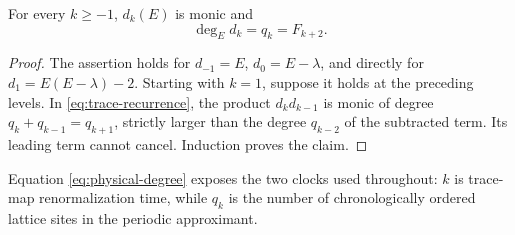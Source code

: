 \begin{proposition}
For every \(k\ge-1\), \(d_k(E)\) is monic and
\begin{equation}
\deg_Ed_k=q_k=F_{k+2}.
\label{eq:physical-degree}
\end{equation}
\end{proposition}

\begin{proof}
The assertion holds for \(d_{-1}=E\), \(d_0=E-\lambda\), and directly for
\(d_1=E(E-\lambda)-2\).  Starting with \(k=1\), suppose it holds at the
preceding levels.  In \eqref{eq:trace-recurrence}, the product
\(d_kd_{k-1}\) is monic of degree \(q_k+q_{k-1}=q_{k+1}\), strictly larger
than the degree \(q_{k-2}\) of the subtracted term.  Its leading term cannot
cancel.  Induction proves the claim.
\end{proof}

Equation \eqref{eq:physical-degree} exposes the two clocks used throughout:
\(k\) is trace-map renormalization time, while \(q_k\) is the number of
chronologically ordered lattice sites in the periodic approximant.
